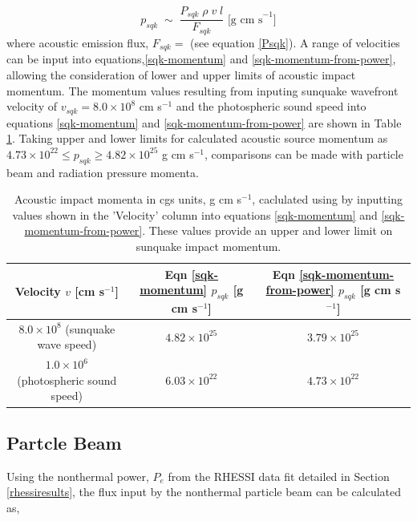 \begin{equation}\label{sqk-momentum-from-power}
p_{sqk} \; \sim \; \frac{P_{sqk} \; \rho \; v \; l }{F_{sqk}} \text{ [g cm s}^{-1}]
\end{equation}
\noindent
where acoustic emission flux, $F_{sqk} = $ (see equation \ref{Psqk}). A range of velocities can be input into equations,\ref{sqk-momentum} and \ref{sqk-momentum-from-power}, allowing the consideration of lower and upper limits of acoustic impact momentum. The momentum values resulting from inputing sunquake wavefront velocity of $v_{sqk} = 8.0{\times}10^{8}$ cm s$^{-1}$ \citep{2014ApJ...796...85J} and the photospheric sound speed into equations \ref{sqk-momentum} and \ref{sqk-momentum-from-power} are shown in Table \ref{sqk-momenta}. Taking upper and lower limits for calculated acoustic source momentum as $4.73{\times}10^{22} \leq p_{sqk} \geq 4.82{\times}10^{25}$ g cm s$^{-1}$, comparisons can be made with particle beam and radiation pressure momenta.\\
\begin{table}[h]
\centering
\begin{tabular}{|c|c|c|}
Velocity $v$ [cm s$^{-1}$] & Eqn \ref{sqk-momentum} $p_{sqk}$ [g cm s$^{-1}$] & Eqn \ref{sqk-momentum-from-power} $p_{sqk}$ [g cm s$^{-1}$]\\
\hline
$8.0{\times}10^{8}$ (sunquake wave speed) & $4.82{\times}10^{25}$ & $3.79{\times}10^{25}$\\
$1.0{\times}10^{6}$ (photospheric sound speed) & $6.03{\times}10^{22}$ & $4.73{\times}10^{22}$\\
\end{tabular}
\caption{Acoustic impact momenta in cgs units, g cm s$^{-1}$, caclulated using by inputting values shown in the 'Velocity' column into equations \ref{sqk-momentum} and \ref{sqk-momentum-from-power}. These values provide an upper and lower limit on sunquake impact momentum.}\label{sqk-momenta}
\end{table}


\subsection{Partcle Beam}
Using the nonthermal power, $P_{e}$ from the RHESSI data fit detailed in Section \ref{rhessiresults}, the flux input by the nonthermal particle beam can be calculated as,

